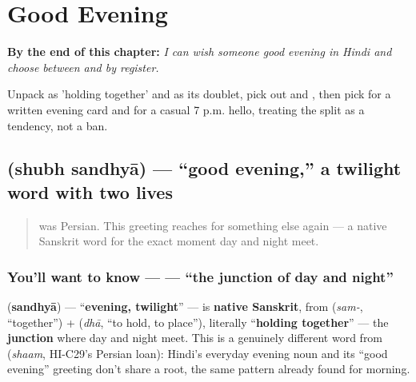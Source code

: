 
\chapter{Good Evening}
\label{ch:hi-good-evening}

\begin{chapteropening}
\textbf{By the end of this chapter:} \emph{I can wish someone good evening in Hindi and choose between   and  by register.}

Unpack  as 'holding together' and  as its doublet, pick out  and , then pick   for a written evening card and  for a casual 7 p.m. hello, treating the split as a tendency, not a ban.
\end{chapteropening}

\section[\texorpdfstring{\hi{शुभ} \hi{संध्या} / \hi{साँझ} (shubh sandhyā / sāñjh)}{शुभ संध्या / साँझ (shubh sandhyā / sāñjh)}]{  (shubh sandhyā) — \textquotedblleft{}good evening,\textquotedblright{} a twilight word with two lives}

\label{lesson:HI-C32-shubh-sandhya}



\begin{quote}
 was Persian. This greeting reaches for something else again — a native Sanskrit word for the exact moment day and night meet.
\end{quote}

\subsection*{You'll want to know —  — \textquotedblleft{}the junction of day and night\textquotedblright{}}
\textbf{} (\textbf{sandhyā}) — \textquotedblleft{}\textbf{evening, twilight}\textquotedblright{} — is \textbf{native Sanskrit}, from \textbf{} (\emph{sam-}, \textquotedblleft{}together\textquotedblright{}) + \textbf{} (\emph{dhā}, \textquotedblleft{}to hold, to place\textquotedblright{}), literally \textquotedblleft{}\textbf{holding together}\textquotedblright{} — the \textbf{junction} where day and night meet. This is a genuinely different word from \textbf{} (\emph{shaam}, HI-C29's Persian loan): Hindi's everyday evening noun and its \textquotedblleft{}good evening\textquotedblright{} greeting don't share a root, the same pattern already found for morning.

